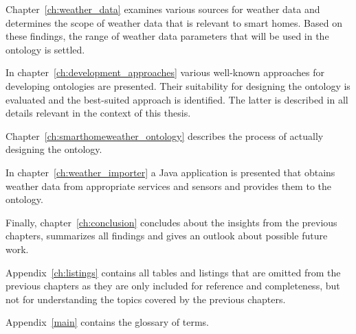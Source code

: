 Chapter~\ref{ch:weather_data} examines various sources for weather data and determines the scope of weather data that is relevant to smart homes. Based on these findings, the range of weather data parameters that will be used in the ontology is settled.

In chapter~\ref{ch:development_approaches} various well-known approaches for developing ontologies are presented. Their suitability for designing the \smarthomeweather ontology is evaluated and the best-suited approach is identified. The latter is described in all details relevant in the context of this thesis.

Chapter~\ref{ch:smarthomeweather_ontology} describes the process of actually designing the \smarthomeweather ontology.

In chapter~\ref{ch:weather_importer} a Java application is presented that obtains weather data from appropriate services and sensors and provides them to the \smarthomeweather ontology.

Finally, chapter~\ref{ch:conclusion} concludes about the insights from the previous chapters, summarizes all findings and gives an outlook about possible future work.

Appendix~\ref{ch:listings} contains all tables and listings that are omitted from the previous chapters as they are only included for reference and completeness, but not for understanding the topics covered by the previous chapters.

Appendix~\ref{main} contains the glossary of terms.
